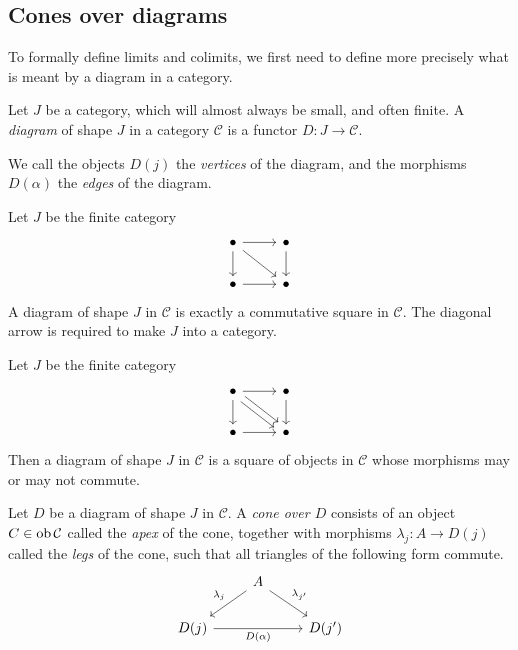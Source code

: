\subsection{Cones over diagrams}
To formally define limits and colimits, we first need to define more precisely what is meant by a diagram in a category.
\begin{definition}
    Let \( J \) be a category, which will almost always be small, and often finite.
    A \emph{diagram} of shape \( J \) in a category \( \mathcal C \) is a functor \( D : J \to \mathcal C \).
\end{definition}
We call the objects \( D(j) \) the \emph{vertices} of the diagram, and the morphisms \( D(\alpha) \) the \emph{edges} of the diagram.
\begin{example}
    Let \( J \) be the finite category
\[\begin{tikzcd}
	\bullet & \bullet \\
	\bullet & \bullet
	\arrow[from=1-1, to=1-2]
	\arrow[from=1-2, to=2-2]
	\arrow[from=1-1, to=2-2]
	\arrow[from=1-1, to=2-1]
	\arrow[from=2-1, to=2-2]
\end{tikzcd}\]
    A diagram of shape \( J \) in \( \mathcal C \) is exactly a commutative square in \( \mathcal C \).
    The diagonal arrow is required to make \( J \) into a category.
\end{example}
\begin{example}
    Let \( J \) be the finite category
\[\begin{tikzcd}
	\bullet & \bullet \\
	\bullet & \bullet
	\arrow[from=1-1, to=1-2]
	\arrow[from=1-2, to=2-2]
	\arrow[from=1-1, to=2-1]
	\arrow[from=2-1, to=2-2]
	\arrow[shift left=1, from=1-1, to=2-2]
	\arrow[shift right=1, from=1-1, to=2-2]
\end{tikzcd}\]
    Then a diagram of shape \( J \) in \( \mathcal C \) is a square of objects in \( \mathcal C \) whose morphisms may or may not commute.
\end{example}
\begin{definition}
    Let \( D \) be a diagram of shape \( J \) in \( \mathcal C \).
    A \emph{cone over \( D \)} consists of an object \( C \in \operatorname{ob} \mathcal C \) called the \emph{apex} of the cone, together with morphisms \( \lambda_j : A \to D(j) \) called the \emph{legs} of the cone, such that all triangles of the following form commute.
\[\begin{tikzcd}
	& A \\
	{D(j)} && {D(j')}
	\arrow["{\lambda_j}"', from=1-2, to=2-1]
	\arrow["{D(\alpha)}"', from=2-1, to=2-3]
	\arrow["{\lambda_{j'}}", from=1-2, to=2-3]
\end{tikzcd}\]
\end{definition}
